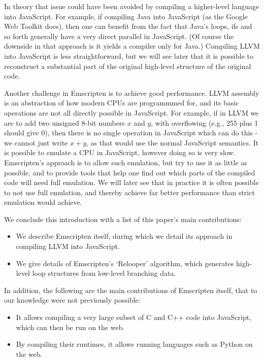 \documentclass[11pt]{proc}
\begin{document}
In theory that issue could have been avoided by compiling a higher-level
language into JavaScript. For example, if compiling Java into JavaScript
(as the Google Web Toolkit does), then one can benefit from the fact
that Java's loops, ifs and so forth generally have a very direct parallel
in JavaScript. (Of course the downside in that approach is it yields a
compiler only for Java.) Compiling LLVM into JavaScript is less straightforward,
but we will see later that it is possible to reconstruct
a substantial part of the original high-level structure of the original code.

Another challenge in Emscripten is to achieve good performance. LLVM assembly
is an abstraction of how modern CPUs are programmmed for, and its basic
operations are not all directly possible in JavaScript. For example, if in
LLVM we are to add two unsigned 8-bit numbers $x$ and $y$, with overflowing (e.g., 255
plus 1 should give 0), then there is no single operation in JavaScript which
can do this - we cannot just write $x+y$, as that would use the normal JavaScript
semantics. It is possible to emulate a CPU in JavaScript, however doing so
is very slow. Emscripten's approach is to allow such emulation, but try to
use it as little as possible, and to provide tools that help one find out
which parts of the compiled code will need full emulation. We will later see that in practice it is often
possible to not use full emulation, and thereby achieve far better performance
than strict emulation would achieve.

We conclude this introduction with a list of this paper's main contributions:
\begin{itemize}
\item We describe Emscripten itself, during
      which we detail its approach in compiling LLVM into JavaScript.
\item We give details of Emscripten's `Relooper' algorithm, which generates
      high-level loop structures from low-level branching data.
\end{itemize}
In addition, the following are the main contributions of Emscripten
itself, that to our knowledge were not previously possible:
\begin{itemize}
\item It allows compiling a very large subset of C and C++ code into
      JavaScript, which can then be run on the web.
\item By compiling their runtimes, it allows running languages such as Python
      on the web.
\end{itemize}
\end{document}
